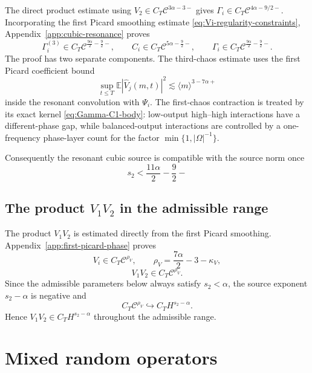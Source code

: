 \documentclass[10pt]{amsart}
\numberwithin{equation}{section}
\theoremstyle{plain}
\theoremstyle{definition}
\theoremstyle{remark}
\newcommand{\E}{\mathbb{E}}
\newcommand{\C}{\mathcal{C}}
\begin{document}
The direct product estimate using $V_2\in C_T\C^{3\alpha-3-}$ gives $\Gamma_i\in C_T\C^{4\alpha-9/2-}$.  Incorporating the first Picard smoothing estimate \eqref{eq:Vi-regularity-constraints}, Appendix~\ref{app:cubic-resonance} proves
\begin{equation}\label{eq:Gamma-regularity-body}
 \Gamma_i^{(3)}\in C_T\C^{\frac{9\alpha}{2}-\frac92-},
 \qquad
 C_i\in C_T\C^{5\alpha-\frac92-},
 \qquad
 \Gamma_i\in C_T\C^{\frac{9\alpha}{2}-\frac92-}.
\end{equation}
The proof has two separate components. The third-chaos estimate uses the first Picard coefficient bound
\[
 \sup_{t\le T}\E|\widehat V_j(m,t)|^2\lesssim \langle m\rangle^{3-7\alpha+}
\]
inside the resonant convolution with $\Psi_i$. The first-chaos contraction is treated by its exact kernel \eqref{eq:Gamma-C1-body}: low-output high--high interactions have a different-phase gap, while balanced-output interactions are controlled by a one-frequency phase-layer count for the factor $\min\{1,|\Omega|^{-1}\}$.

Consequently the resonant cubic source is compatible with the source norm once
\begin{equation}\label{eq:Gamma-source-body}
 s_2<\frac{11\alpha}{2}-\frac92-
\end{equation}


\subsection{The product \texorpdfstring{$V_1V_2$}{of the first Picard terms} in the admissible range}\label{subsec:first-picard-product}
The product $V_1V_2$ is estimated directly from the first Picard smoothing.  Appendix~\ref{app:first-picard-phase} proves
\[
  V_i\in C_T\C^{\rho_V},\qquad \rho_V=\frac{7\alpha}{2}-3-\kappa_V,
\]
\begin{equation}\label{eq:first-picard-product-regularity}
  V_1V_2\in C_T\C^{\rho_V}.
\end{equation}
Since the admissible parameters below always satisfy $s_2<\alpha$, the source exponent $s_2-\alpha$ is negative and
\begin{equation}\label{eq:V1V2-source-condition}
  C_T\C^{\rho_V}\hookrightarrow C_TH^{s_2-\alpha}.
\end{equation}
Hence $V_1V_2\in C_TH^{s_2-\alpha}$ throughout the admissible range.

\section{Mixed random operators}\label{sec:random-operators}
\end{document}

